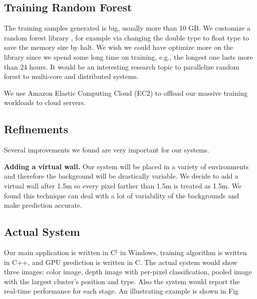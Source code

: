 \subsection{Training Random Forest}

The training samples generated is big, usually more than 10 GB. We customize a random forest library \cite{alglib}, for example via changing the double type to float type to save the memory size by halt. We wish we could have optimize more on the library since we spend some long time on training, e.g., the longest one lasts more than 24 hours. It would be an interesting research topic to parallelize random forest to multi-core and distributed systems.     

We use Amazon Elastic Computing Cloud (EC2) to offload our massive training workloads to cloud servers.  

\subsection{Refinements}

Several improvements we found are very important for our systems.

\textbf{Adding a virtual wall.} Our system will be placed in a variety of environments and therefore the background will be drastically variable. We decide to add a virtual wall after 1.5m so every pixel farther than 1.5m is treated as 1.5m. We found this technique can deal with a lot of variability of the backgrounds and make prediction accurate. 


\subsection{Actual System}

Our main application is written in C$^\sharp$ in Windows, training algorithm is written in C++, and GPU prediction is written in C. The actual system would show three images: color image, depth image with per-pixel classification, pooled image with the largest cluster's position and type. Also the system would report the real-time performance for each stage. An illustrating example is shown in Fig 


